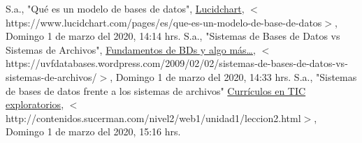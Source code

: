 \documentclass[
	10pt, %
	spanish %
]{fphw}
\begin{document}

\begin{thebibliography}{1}
  		\bibitem {} S.a., "Qué es un modelo de bases de datos", \underline{Lucidchart}, $<$https://www.lucidchart.com/pages/es/que-es-un-modelo-de-base-de-datos$>$, Domingo 1 de marzo del 2020, 14:14 hrs.
  		\bibitem {} S.a., "Sistemas de Bases de Datos vs Sistemas de Archivos", \underline{Fundamentos de BDs y algo más…}, $<$https://uvfdatabases.wordpress.com/2009/02/02/sistemas-de-bases-de-datos-vs-sistemas-de-archivos/$>$, Domingo 1 de marzo del 2020, 14:33 hrs.
  		\bibitem {} S.a., "Sistemas de bases de datos frente a los sistemas de archivos" \underline{Currículos en TIC exploratorios}, $<$http://contenidos.sucerman.com/nivel2/web1/unidad1/leccion2.html$>$, Domingo 1 de marzo del 2020, 15:16 hrs.
  		
\end{thebibliography}
\end{document}
